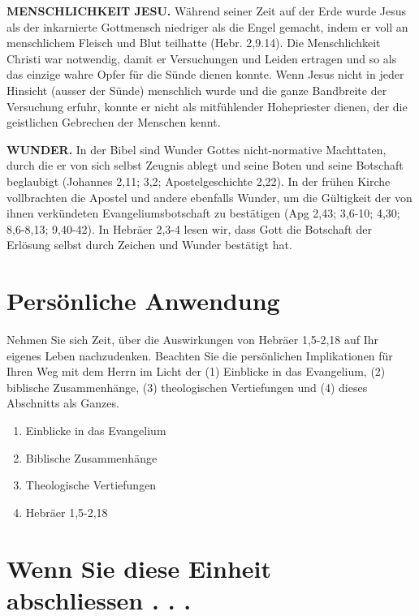 \documentclass[]{krantz}
\providecommand{\tightlist}{%
  \setlength{\itemsep}{0pt}\setlength{\parskip}{0pt}}
\begin{document}
\textbf{MENSCHLICHKEIT JESU.} Während seiner Zeit auf der Erde wurde
Jesus als der inkarnierte Gottmensch niedriger als die Engel gemacht,
indem er voll an menschlichem Fleisch und Blut teilhatte (Hebr. 2,9.14).
Die Menschlichkeit Christi war notwendig, damit er Versuchungen und
Leiden ertragen und so als das einzige wahre Opfer für die Sünde dienen
konnte. Wenn Jesus nicht in jeder Hinsicht (ausser der Sünde) menschlich
wurde und die ganze Bandbreite der Versuchung erfuhr, konnte er nicht
als mitfühlender Hohepriester dienen, der die geistlichen Gebrechen der
Menschen kennt.

\textbf{WUNDER.} In der Bibel sind Wunder Gottes nicht-normative
Machttaten, durch die er von sich selbst Zeugnis ablegt und seine Boten
und seine Botschaft beglaubigt (Johannes 2,11; 3,2; Apostelgeschichte
2,22). In der frühen Kirche vollbrachten die Apostel und andere
ebenfalls Wunder, um die Gültigkeit der von ihnen verkündeten
Evangeliumsbotschaft zu bestätigen (Apg 2,43; 3,6-10; 4,30; 8,6-8,13;
9,40-42). In Hebräer 2,3-4 lesen wir, dass Gott die Botschaft der
Erlösung selbst durch Zeichen und Wunder bestätigt hat.

\section{Persönliche Anwendung}\label{persuxf6nliche-anwendung-1}

Nehmen Sie sich Zeit, über die Auswirkungen von Hebräer 1,5-2,18 auf Ihr
eigenes Leben nachzudenken. Beachten Sie die persönlichen Implikationen
für Ihren Weg mit dem Herrn im Licht der (1) Einblicke in das
Evangelium, (2) biblische Zusammenhänge, (3) theologischen Vertiefungen
und (4) dieses Abschnitts als Ganzes.

\begin{enumerate}
\def\labelenumi{\arabic{enumi}.}
\tightlist
\item
  Einblicke in das Evangelium
\item
  Biblische Zusammenhänge
\item
  Theologische Vertiefungen
\item
  Hebräer 1,5-2,18
\end{enumerate}

\section{Wenn Sie diese Einheit abschliessen . .
.}\label{wenn-sie-diese-einheit-abschliessen-.-.-.-1}
\end{document}
